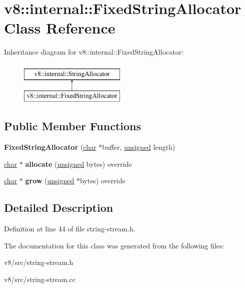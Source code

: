 \hypertarget{classv8_1_1internal_1_1FixedStringAllocator}{}\section{v8\+:\+:internal\+:\+:Fixed\+String\+Allocator Class Reference}
\label{classv8_1_1internal_1_1FixedStringAllocator}
Inheritance diagram for v8\+:\+:internal\+:\+:Fixed\+String\+Allocator\+:\begin{figure}[H]
\begin{center}
\leavevmode
\includegraphics[height=2.000000cm]{classv8_1_1internal_1_1FixedStringAllocator}
\end{center}
\end{figure}
\subsection*{Public Member Functions}
\begin{DoxyCompactItemize}
\item 
\mbox{\label{classv8_1_1internal_1_1FixedStringAllocator_a8327dc2f70cdf30c8386b460f7e2545e}} 
{\bfseries Fixed\+String\+Allocator} (\mbox{\hyperlink{classchar}{char}} $\ast$buffer, \mbox{\hyperlink{classunsigned}{unsigned}} length)
\item 
\mbox{\label{classv8_1_1internal_1_1FixedStringAllocator_a948b0119934f194ec43cb572136c83c7}} 
\mbox{\hyperlink{classchar}{char}} $\ast$ {\bfseries allocate} (\mbox{\hyperlink{classunsigned}{unsigned}} bytes) override
\item 
\mbox{\label{classv8_1_1internal_1_1FixedStringAllocator_ac8963e7976514b993219071c4368a430}} 
\mbox{\hyperlink{classchar}{char}} $\ast$ {\bfseries grow} (\mbox{\hyperlink{classunsigned}{unsigned}} $\ast$bytes) override
\end{DoxyCompactItemize}


\subsection{Detailed Description}


Definition at line 44 of file string-\/stream.\+h.



The documentation for this class was generated from the following files\+:\begin{DoxyCompactItemize}
\item 
v8/src/string-\/stream.\+h\item 
v8/src/string-\/stream.\+cc\end{DoxyCompactItemize}
